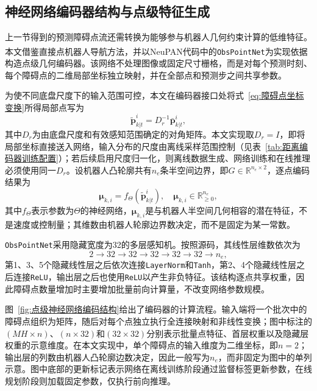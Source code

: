 \subsection{神经网络编码器结构与点级特征生成}
上一节得到的预测障碍点流还需转换为能够参与机器人几何约束计算的低维特征。本文借鉴直接点机器人导航方法\textsuperscript{\cite{han2025directpoint}}，并以NeuPAN代码中的\texttt{ObsPointNet}为实现依据构造点级几何编码器。该网络不处理图像或固定尺寸栅格，而是对每个预测时刻、每个障碍点的二维局部坐标独立映射，并在全部点和预测步之间共享参数。

为使不同底盘尺度下的输入范围可控，本文在编码器接口处将式~\eqref{eq:障碍点坐标变换}所得局部点写为
\begin{equation}
	\tilde{\mathbf{p}}_{k|t}^{i}
	=
	D_r^{-1}\bar{\mathbf{p}}_{k|t}^{i},
	\label{eq:编码器输入归一化}
\end{equation}
其中$D_r$为由底盘尺度和有效感知范围确定的对角矩阵。本文实现取$D_r=I$，即将局部坐标直接送入网络，输入分布的尺度由离线采样范围控制（见表~\ref{tab:距离编码器训练配置}）；若后续启用尺度归一化，则离线数据生成、网络训练和在线推理必须使用同一$D_r$。设机器人凸轮廓共有$n_e$条半空间边界，即$G\in\mathbb{R}^{n_e\times2}$，逐点编码结果为
\begin{equation}
	\boldsymbol{\mu}_{k,i}
	=
	f_{\Theta}\left(\tilde{\mathbf{p}}_{k|t}^{i}\right),
	\quad
	\boldsymbol{\mu}_{k,i}\in\mathbb{R}_{\geq0}^{n_e},
	\label{eq:神经编码器点特征}
\end{equation}
其中$f_{\Theta}$表示参数为$\Theta$的神经网络，$\boldsymbol{\mu}_{k,i}$是与机器人半空间几何相容的潜在特征，不是速度或控制量；其维数由机器人轮廓边界数决定，而不是固定为某一常数。

\texttt{ObsPointNet}采用隐藏宽度为32的多层感知机。按照源码，其线性层维数依次为
\begin{equation}
	2\rightarrow32\rightarrow32\rightarrow32\rightarrow32\rightarrow32\rightarrow n_e,
	\label{eq:神经编码器层宽}
\end{equation}
第1、3、5个隐藏线性层之后依次连接\texttt{LayerNorm}和\texttt{Tanh}，第2、4个隐藏线性层之后连接\texttt{ReLU}，输出层之后也使用\texttt{ReLU}以产生非负特征。该结构逐点共享权重，因此障碍点数量增加时主要增加批量前向计算量，不改变网络参数规模。

图~\ref{fig:点级神经网络编码结构}给出了编码器的计算流程。输入端将一个批次中的障碍点组织为矩阵，随后对每个点独立执行全连接映射和非线性变换；图中标注的$(MH\times n)$、$(n\times32)$和$(32\times32)$分别表示批量点特征、首层权重以及隐藏层权重的示意维度。在本文实现中，单个障碍点的输入维度为二维坐标，即$n=2$；输出层的列数由机器人凸轮廓边数决定，因此一般写为$n_e$，而非固定为图中的单列示意。图中底部的更新标记表示网络在离线训练阶段通过监督标签更新参数，在线规划阶段则加载固定参数，仅执行前向推理。

